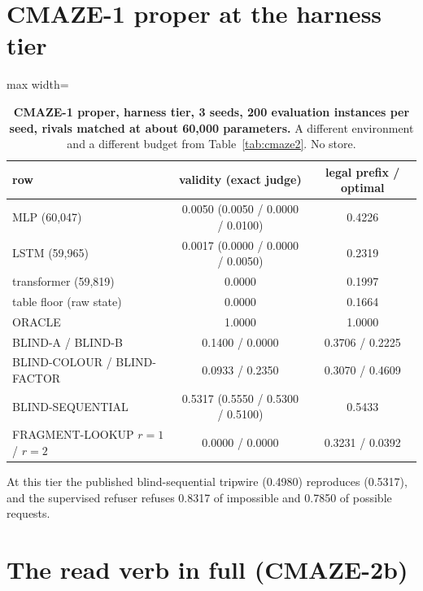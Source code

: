 \documentclass{article} %
\begin{document}
\section{CMAZE-1 proper at the harness tier}
\label{app:cmaze1}

\begin{table}[h]
\centering\small
\caption{\textbf{CMAZE-1 proper, harness tier, 3 seeds, 200 evaluation instances per seed, rivals %
matched at about 60,000 parameters.} A different environment and a different budget from %
Table~\ref{tab:cmaze2}. No store.}
\label{tab:cmaze1}
\begin{adjustbox}{max width=\linewidth}\begin{tabular}{lcc}
\toprule
row & validity (exact judge) & legal prefix / optimal \\
\midrule
MLP (60,047) & 0.0050 (0.0050 / 0.0000 / 0.0100) & 0.4226 \\
LSTM (59,965) & 0.0017 (0.0000 / 0.0000 / 0.0050) & 0.2319 \\
transformer (59,819) & 0.0000 & 0.1997 \\
table floor (raw state) & 0.0000 & 0.1664 \\
ORACLE & 1.0000 & 1.0000 \\
BLIND-A / BLIND-B & 0.1400 / 0.0000 & 0.3706 / 0.2225 \\
BLIND-COLOUR / BLIND-FACTOR & 0.0933 / 0.2350 & 0.3070 / 0.4609 \\
BLIND-SEQUENTIAL & 0.5317 (0.5550 / 0.5300 / 0.5100) & 0.5433 \\
FRAGMENT-LOOKUP $r=1$ / $r=2$ & 0.0000 / 0.0000 & 0.3231 / 0.0392 \\
\bottomrule
\end{tabular}\end{adjustbox}
\end{table}

\noindent At this tier the published blind-sequential tripwire (0.4980) reproduces (0.5317), and
the supervised refuser refuses 0.8317 of impossible and 0.7850 of possible requests.

\section{The read verb in full (CMAZE-2b)}
\label{app:verb}
\end{document}
